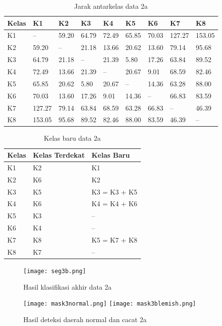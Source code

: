 \documentclass[laporan.tex]{subfiles}
\begin{document}
\begin{table}[h!]
\centering
\begin{tabular}{|l|l|l|l|l|l|l|l|l|}
\hline
Kelas & K1 & K2 & K3 & K4 & K5 & K6 & K7 & K8 \\
\hline
K1 & -- & 59.20 & 64.79 & 72.49 & 65.85 & 70.03 & 127.27 & 153.05 \\
K2 & 59.20 & -- & 21.18 & 13.66 & 20.62 & 13.60 & 79.14 & 95.68 \\
K3 & 64.79 & 21.18 & --	& 21.39 & 5.80 & 17.26 & 63.84 & 89.52 \\
K4 & 72.49 & 13.66 & 21.39 & --	& 20.67 & 9.01 & 68.59 & 82.46 \\
K5 & 65.85 & 20.62 & 5.80 & 20.67 & -- & 14.36 & 63.28 & 88.00 \\
K6 & 70.03 & 13.60 & 17.26 & 9.01 & 14.36 & -- & 66.83 & 83.59 \\
K7 & 127.27 & 79.14 & 63.84 & 68.59 & 63.28 & 66.83 & -- & 46.39 \\
K8 & 153.05 & 95.68 & 89.52 & 82.46 & 88.00 & 83.59 & 46.39 & -- \\
\hline
\end{tabular}
\caption[]{Jarak antarkelas data 2a}
\label{table:distyellow}
\end{table}

\begin{table}[h!]
\centering
\begin{tabular}{|l|l|l|}
\hline
Kelas & Kelas Terdekat & Kelas Baru \\
\hline
K1 & K2 & K1 \\
K2 & K6 & K2 \\
K3 & K5 & K3 = K3 + K5 \\
K4 & K6 & K4 = K4 + K6 \\
K5 & K3 & -- \\
K6 & K4 & -- \\
K7 & K8 & K5 = K7 + K8 \\
K8 & K7 & -- \\
\hline
\end{tabular}
\caption[]{Kelas baru data 2a}
\label{table:clsyellow2}
\end{table}

\begin{figure}[h!]
\centering
\texttt{[image: seg3b.png]}
\caption[]{Hasil klasifikasi akhir data 2a}
\end{figure}

\begin{figure}[h!]
\centering
\texttt{[image: mask3normal.png]} \qquad
\texttt{[image: mask3blemish.png]}
\caption[]{Hasil deteksi daerah normal dan cacat 2a}
\end{figure}
\end{document}
